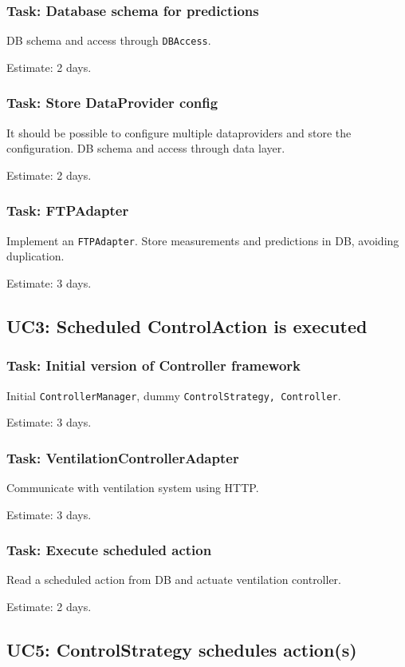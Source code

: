 \subsubsection{Task: Database schema for predictions}
DB schema and access through \texttt{DBAccess}.

Estimate: 2 days.

\subsubsection{Task: Store DataProvider config}
It should be possible to configure multiple dataproviders and store the configuration. DB schema and access through data layer.

Estimate: 2 days.

\subsubsection{Task: FTPAdapter}
Implement an \texttt{FTPAdapter}. Store measurements and predictions in DB, avoiding duplication.

Estimate: 3 days.

\subsection*{UC3: Scheduled ControlAction is executed}
\subsubsection{Task: Initial version of Controller framework}
Initial \texttt{ControllerManager}, dummy \texttt{ControlStrategy, Controller}.

Estimate: 3 days.

\subsubsection{Task: VentilationControllerAdapter}
Communicate with ventilation system using HTTP.

Estimate: 3 days.

\subsubsection{Task: Execute scheduled action}
Read a scheduled action from DB and actuate ventilation controller.

Estimate: 2 days.

\subsection*{UC5: ControlStrategy schedules action(s)}
